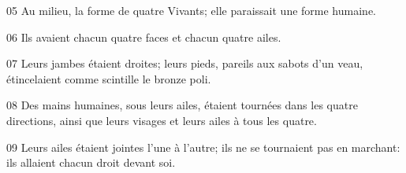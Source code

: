 
05 Au milieu, la forme de quatre Vivants; elle paraissait une forme humaine.

06 Ils avaient chacun quatre faces et chacun quatre ailes.

07 Leurs jambes étaient droites; leurs pieds, pareils aux sabots d’un veau, étincelaient comme scintille le bronze poli.

08 Des mains humaines, sous leurs ailes, étaient tournées dans les quatre directions, ainsi que leurs visages et leurs ailes à tous les quatre.

09 Leurs ailes étaient jointes l’une à l’autre; ils ne se tournaient pas en marchant: ils allaient chacun droit devant soi.

